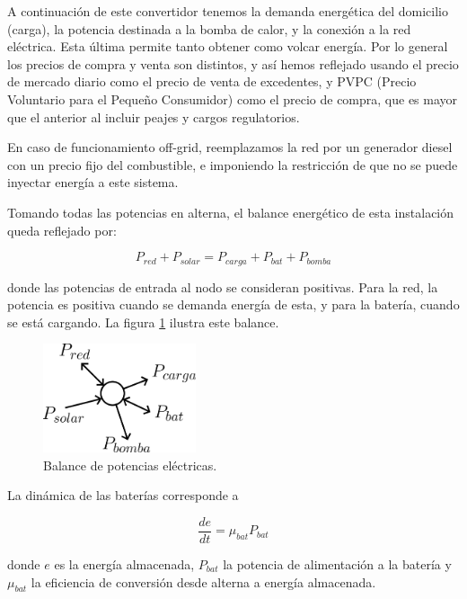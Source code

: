 A continuación de este convertidor tenemos la demanda energética del domicilio
(carga), la potencia destinada a la bomba de calor, y la conexión a la red
eléctrica. Esta última permite tanto obtener como volcar energía. Por lo
general los precios de compra y venta son distintos, y así hemos reflejado
usando el precio de mercado diario como el precio de venta de excedentes, y
PVPC (Precio Voluntario para el Pequeño Consumidor) como el precio de compra,
que es mayor que el anterior al incluir peajes y cargos regulatorios.

En caso de funcionamiento off-grid, reemplazamos la red por un generador
diesel con un precio fijo del combustible, e imponiendo la restricción de que
no se puede inyectar energía a este sistema.

Tomando todas las potencias en alterna, el balance energético de esta
instalación queda reflejado por:

\begin{equation}
	P_{red} + P_{solar} = P_{carga} + P_{bat} + P_{bomba}
\end{equation}

donde las potencias de entrada al nodo se consideran positivas. Para la red,
la potencia es positiva cuando se demanda energía de esta, y para la batería,
cuando se está cargando. La figura \ref{fig:electric_node} ilustra este
balance.

\begin{figure}[h] \centering
	\centering
	\includegraphics[width=0.4\textwidth]{./capitulos/resultados_discusion/images/electric_node.png}
	\caption{Balance de potencias eléctricas.}
	\label{fig:electric_node}
\end{figure}

La dinámica de las baterías corresponde a

\begin{equation}
	\frac{de}{dt} = \mu_{bat} P_{bat}
\end{equation}

donde $e$ es la energía almacenada, $P_{bat}$ la potencia de alimentación a la
batería y $\mu_{bat}$ la eficiencia de conversión desde alterna a energía
almacenada.

